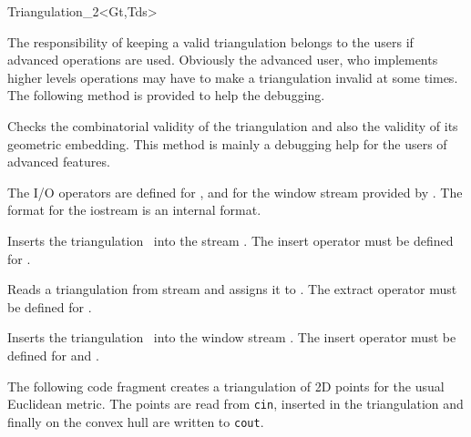 \begin{ccClassTemplate}{Triangulation_2<Gt,Tds>}
\begin{ccAdvanced}
\ccGlue
{}
\ccGlue
{}

The responsibility of keeping a valid triangulation
belongs to the users if advanced operations are used.
Obviously the advanced user, who implements higher levels operations
may have to make a triangulation invalid at some times. The following
method is provided to help the debugging.

{Checks the combinatorial validity of the triangulation and
also the validity of its geometric embedding.
 This method is  mainly a debugging help
for the users of advanced features.
}
\end{ccAdvanced}





The I/O operators are defined for , and for
the window stream provided by \cgal. The format for the iostream
is an internal format. 


{Inserts the triangulation \ccVar\ into the stream .
\ccPrecond The insert operator must be defined for .}

{Reads a triangulation from stream  and assigns it
to \ccVar. \ccPrecond The extract operator must be defined for .}


{Inserts the triangulation \ccVar\ into the window stream .
The insert operator must be defined for 
and .}

\ccExample

The following code fragment creates a  triangulation of 2D points
for the  usual Euclidean metric. The points are read from {\tt cin},
inserted in the triangulation 
and finally on the convex hull are written to {\tt cout}. 



\end{ccClassTemplate}
